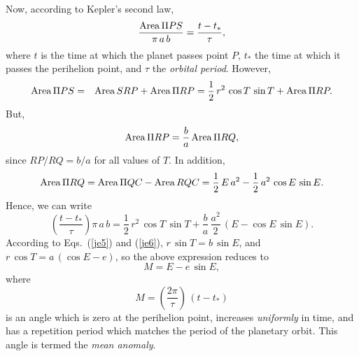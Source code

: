 Now, according to Kepler's second law,
\begin{equation}
\frac{{\rm Area}\,\Pi PS}{\pi\,a\,b} = \frac{t-t_\ast}{\tau},
\end{equation}
where $t$ is the time at which the planet passes point $P$,  $t_\ast$  the time at which it passes the perihelion point,
and $\tau$ the {\em orbital period}.
However,
\begin{eqnarray}
{\rm Area}  \,\Pi PS &=& {\rm Area}\, SRP + {\rm Area} \,\Pi RP
= \frac{1}{2}\,r^2\,\cos T\,\sin T + {\rm Area}\,\Pi RP.
\end{eqnarray}
But,
\begin{equation}
{\rm Area}\,\Pi RP = \frac{b}{a}\,{\rm Area}\,\Pi RQ,
\end{equation}
since $RP/RQ = b/a$ for all values of $T$. In addition, 
\begin{eqnarray}
{\rm Area}\,\Pi RQ = {\rm Area}\,\Pi QC - {\rm Area}\,RQC= \frac{1}{2}\,E\,a^2 - \frac{1}{2}\,a^2\,\cos E\,\sin E.
\end{eqnarray}
Hence, we can write
\begin{equation}
\left(\frac{t-t_\ast}{\tau}\right) \pi\,a\,b= \frac{1}{2}\,r^2\,\cos T\,\sin T + \frac{b}{a}\,\frac{a^2}{2}\,(E - \cos E\,\sin E).
\end{equation}
According to Eqs.~(\ref{je5}) and (\ref{je6}), $r\,\sin T = b\,\sin E$, and $r\,\cos T = a\,(\cos E - e)$, so
the above expression reduces to
\begin{equation}
M = E - e\,\sin E,
\end{equation}
where
\begin{equation}
M = \left(\frac{2\pi}{\tau}\right)\,(t-t_\ast)
\end{equation}
is an angle which is zero at the perihelion point, increases {\em uniformly}\/ in time, and has a repetition period which
matches the period of the planetary orbit. This angle is termed the {\em mean anomaly}. 

